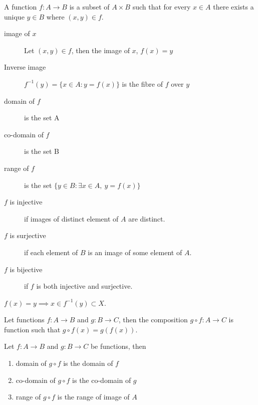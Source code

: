 	\begin{definition}
		A function $ f : A \to B$ is a subset of $A \times B$ such that for every $x \in A$ there exists a unique $y \in B$ where $(x,y) \in f$. 
	\end{definition}

	\begin{description}
		\item[image of $x$] Let $(x,y) \in f$, then the image of $x$, $ f(x) = y$
		\item[Inverse image] $f^{-1}(y) = \{ x \in A : y = f(x) \}$ is the fibre of $f$ over $y$\cite{gallian}
		\item[domain of $f$] is the set A 
		\item[co-domain of $f$] is the set B
		\item[range of $f$] is the set $\{ y\in B : \exists x \in A,\ y = f(x) \}$
	\end{description}

	\begin{description}
		\item[$f$ is injective] if images of distinct element of $A$ are distinct.
		\item[$f$ is surjective] if each element of $B$ is an image of some element of $A$.
		\item[$f$ is bijective] if $f$ is both injective and surjective.
	\end{description}

	\begin{remark}
		$f(x) = y \implies x \in f^{-1}(y) \subset X$.
	\end{remark}

	\begin{definition}
		Let functions $f : A \to B$ and $g : B \to C$, then the composition $g \circ f : A \to C$ is function such that $g \circ f (x) = g(f(x))$.
	\end{definition}

	\begin{theorem} Let $f : A \to B$ and $g : B \to C$ be functions, then
		\begin{enumerate}
			\item domain of $g \circ f$ is the domain of $f$
			\item co-domain of $g \circ f$ is the co-domain of $g$
			\item range of $g \circ f$ is the range of image of $A$ 
		\end{enumerate}
	\end{theorem}

